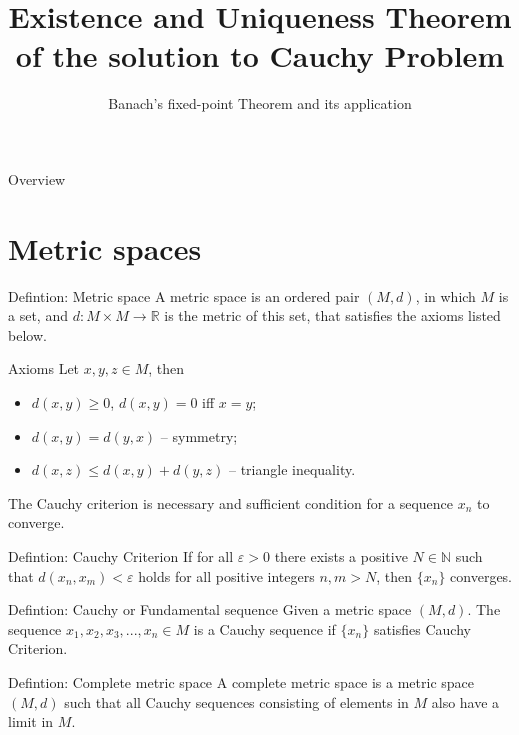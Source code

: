 \documentclass[10pt]{beamer}
\title[Existence and Uniqueness Theorem of the solution to Cauchy Problem]
{Existence and Uniqueness Theorem of the solution to Cauchy Problem}
\subtitle
{Banach's fixed-point Theorem and its application}
\begin{document}
\begin{frame}
  \titlepage
\end{frame}

\begin{frame}{Overview}
  \tableofcontents
\end{frame}

\section{Metric spaces}
\begin{frame}
	\begin{block}{Defintion: Metric space}
		A metric space is an ordered pair \((M, d)\), in which \(M\) is a set,
		and \(d:M \times M \rightarrow \mathbb{R}\) is the metric of this set, that satisfies
		the axioms listed below.
	\end{block}

	\begin{alertblock}{Axioms}
		Let \(x, y, z \in M\), then
		\begin{itemize}
			\item \(d(x, y) \ge 0\), \(d(x, y) = 0\) iff \(x = y\);
			\item \(d(x, y) = d(y, x)\) -- symmetry;
			\item \(d(x, z) \le d(x, y) + d(y, z)\) -- triangle inequality.
		\end{itemize}
	\end{alertblock}
\end{frame}

\begin{frame}
	The Cauchy criterion is necessary and sufficient condition for a sequence \(x_n\) to converge.
	\begin{block}{Defintion: Cauchy Criterion}
		If for all \(\varepsilon > 0\) there exists a positive \(N \in \mathbb{N}\) such that
		\(d(x_n, x_m) < \varepsilon\) holds for all positive integers \(n, m > N\), then \(\{x_n\}\) converges.
	\end{block}

	\begin{block}{Defintion: Cauchy or Fundamental sequence}
		Given a metric space \((M, d)\). The sequence \(x_1, x_2, x_3, ..., x_n \in M\) is a Cauchy sequence if
		\(\{x_n\}\) satisfies Cauchy Criterion.
	\end{block}

	\begin{block}{Defintion: Complete metric space}
		A complete metric space is a metric space \((M, d)\) such that
		all Cauchy sequences consisting of elements in \(M\) also have a limit in \(M\).
	\end{block}
\end{frame}
\end{document}
